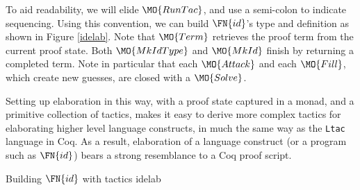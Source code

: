 
To aid readability, we will elide $\MO{RunTac}$, and use a semi-colon to indicate
sequencing. Using this convention, we can build $\FN{id}$'s type and definition as shown
in Figure \ref{idelab}. Note that $\MO{Term}$ retrieves the proof term from the current proof
state. Both $\MO{MkIdType}$ and $\MO{MkId}$ finish by returning a completed \TT{} term.
Note in particular that each $\MO{Attack}$ and each $\MO{Fill}$, which create new guesses,
are closed with a $\MO{Solve}$.

Setting up elaboration in this way, with a proof state captured in a monad,
and a primitive collection of tactics,
makes it easy to derive more complex tactics for elaborating higher level language constructs,
in much the same way as the \texttt{Ltac} language in Coq. As a result, elaboration of
a language construct (or a program such as $\FN{id}$) bears a strong resemblance to
a Coq proof script.

{Building $\FN{id}$ with tactics}
{idelab}

